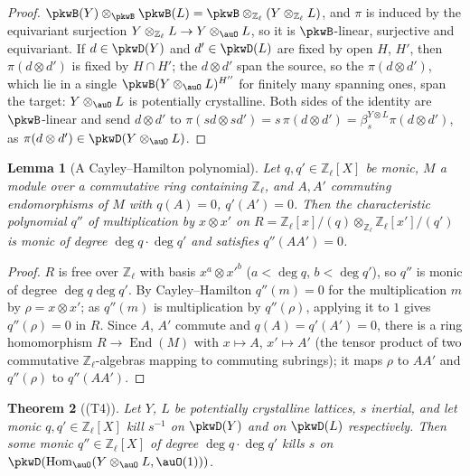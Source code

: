 \documentclass[10pt]{amsart}
\newtheorem{theorem}{Theorem}[section]
\newtheorem{lemma}[theorem]{Lemma}
\theoremstyle{definition}
\theoremstyle{remark}
\newcommand{\Z}{\mathbb Z}
\begin{document}
\begin{proof}
$\pkwB(Y)\otimes_{\pkwB}\pkwB(L)=\pkwB\otimes_{\Z_\ell}(Y\otimes_{\Z_\ell}L)$, and $\pi$ is induced by the
equivariant surjection $Y\otimes_{\Z_\ell}L\to Y\otimes_\auO L$, so it is $\pkwB$-linear, surjective and
equivariant. If $d\in\pkwD(Y)$ and $d'\in\pkwD(L)$ are fixed by open $H$, $H'$, then $\pi(d\otimes d')$ is fixed
by $H\cap H'$; the $d\otimes d'$ span the source, so the $\pi(d\otimes d')$, which lie in a single
$\pkwB(Y\otimes_\auO L)^{H''}$ for finitely many spanning ones, span the target: $Y\otimes_\auO L$ is potentially
crystalline. Both sides of the identity are $\pkwB$-linear and send $d\otimes d'$ to
$\pi(sd\otimes sd')=s\,\pi(d\otimes d')=\beta^{Y\otimes L}_s\pi(d\otimes d')$, as $\pi(d\otimes d')\in
\pkwD(Y\otimes_\auO L)$.
\end{proof}

\begin{lemma}[A Cayley--Hamilton polynomial]\label{pkw:CH}
Let $q,q'\in\Z_\ell[X]$ be monic, $M$ a module over a commutative ring containing $\Z_\ell$, and $A,A'$ commuting
endomorphisms of $M$ with $q(A)=0$, $q'(A')=0$. Then the characteristic polynomial $q''$ of multiplication by
$x\otimes x'$ on $R=\Z_\ell[x]/(q)\otimes_{\Z_\ell}\Z_\ell[x']/(q')$ is monic of degree $\deg q\cdot\deg q'$ and
satisfies $q''(AA')=0$.
\end{lemma}

\begin{proof}
$R$ is free over $\Z_\ell$ with basis $x^a\otimes x'^b$ ($a<\deg q$, $b<\deg q'$), so $q''$ is monic of degree
$\deg q\deg q'$. By Cayley--Hamilton $q''(m)=0$ for the multiplication $m$ by $\rho=x\otimes x'$; as $q''(m)$ is
multiplication by $q''(\rho)$, applying it to $1$ gives $q''(\rho)=0$ in $R$. Since $A$, $A'$ commute and
$q(A)=q'(A')=0$, there is a ring homomorphism $R\to\operatorname{End}(M)$ with $x\mapsto A$, $x'\mapsto A'$ (the
tensor product of two commutative $\Z_\ell$-algebras mapping to commuting subrings); it maps $\rho$ to $AA'$ and
$q''(\rho)$ to $q''(AA')$.
\end{proof}

\begin{theorem}[(T4)]\label{pkw:T4}
Let $Y$, $L$ be potentially crystalline lattices, $s$ inertial, and let monic $q,q'\in\Z_\ell[X]$ kill $s^{-1}$ on
$\pkwD(Y)$ and on $\pkwD(L)$ respectively. Then some monic $q''\in\Z_\ell[X]$ of degree $\deg q\cdot\deg q'$ kills
$s$ on $\pkwD(\operatorname{Hom}_\auO(Y\otimes_\auO L,\auO(1)))$.
\end{theorem}
\end{document}
